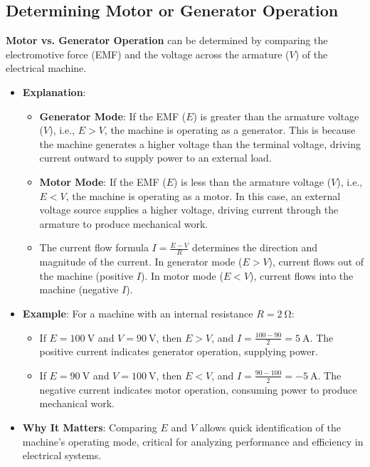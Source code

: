 \documentclass[12pt]{article}
\newcommand{\concept}[1]{\textbf{#1}}
\begin{document}
\subsection{Determining Motor or Generator Operation}
\concept{Motor vs. Generator Operation} can be determined by comparing the electromotive force (EMF) and the voltage across the armature (\(V\)) of the electrical machine.
\begin{itemize}
    \item \textbf{Explanation}: 
        \begin{itemize}
            \item \textbf{Generator Mode}: If the EMF (\(E\)) is greater than the armature voltage (\(V\)), i.e., \(E > V\), the machine is operating as a generator. This is because the machine generates a higher voltage than the terminal voltage, driving current outward to supply power to an external load.
            \item \textbf{Motor Mode}: If the EMF (\(E\)) is less than the armature voltage (\(V\)), i.e., \(E < V\), the machine is operating as a motor. In this case, an external voltage source supplies a higher voltage, driving current through the armature to produce mechanical work.
            \item The current flow formula \(I = \frac{E - V}{R}\) determines the direction and magnitude of the current. In generator mode (\(E > V\)), current flows out of the machine (positive \(I\)). In motor mode (\(E < V\)), current flows into the machine (negative \(I\)).
        \end{itemize}
    \item \textbf{Example}: For a machine with an internal resistance \(R = \SI{2}{\ohm}\):
        \begin{itemize}
            \item If \(E = \SI{100}{\volt}\) and \(V = \SI{90}{\volt}\), then \(E > V\), and \(I = \frac{100 - 90}{2} = \SI{5}{\ampere}\). The positive current indicates generator operation, supplying power.
            \item If \(E = \SI{90}{\volt}\) and \(V = \SI{100}{\volt}\), then \(E < V\), and \(I = \frac{90 - 100}{2} = \SI{-5}{\ampere}\). The negative current indicates motor operation, consuming power to produce mechanical work.
        \end{itemize}
    \item \textbf{Why It Matters}: Comparing \(E\) and \(V\) allows quick identification of the machine’s operating mode, critical for analyzing performance and efficiency in electrical systems.
\end{itemize}
\end{document}
